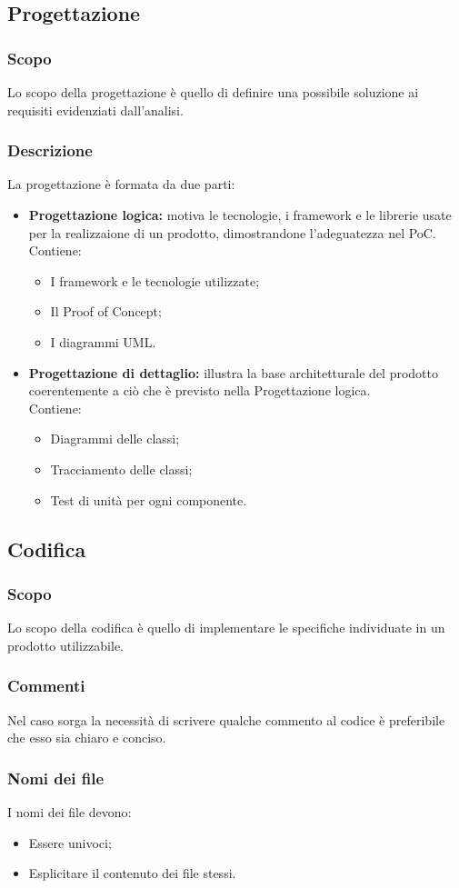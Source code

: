   \subsection{Progettazione}
  \subsubsection{Scopo}
  Lo scopo della progettazione è quello di definire una possibile soluzione ai requisiti evidenziati dall'analisi.
  \subsubsection{Descrizione}
  La progettazione è formata da due parti:
  \begin{itemize}
    \item \textbf{Progettazione logica:} motiva le tecnologie, i framework e le librerie usate per la realizzaione di un prodotto, dimostrandone l'adeguatezza nel PoC.
    \\Contiene:
    \begin{itemize}
      \item I framework e le tecnologie utilizzate;
      \item Il Proof of Concept;
      \item I diagrammi UML.
    \end{itemize}
    \item \textbf{Progettazione di dettaglio:} illustra la base architetturale del prodotto coerentemente a ciò che è previsto nella Progettazione logica.
    \\Contiene:
    \begin{itemize}
      \item Diagrammi delle classi;
      \item Tracciamento delle classi;
      \item Test di unità per ogni componente.
    \end{itemize}
  \end{itemize}

  \subsection{Codifica}
  \subsubsection{Scopo}
  Lo scopo della codifica è quello di implementare le specifiche individuate in un prodotto utilizzabile.
  \subsubsection{Commenti}
  Nel caso sorga la necessità di scrivere qualche commento al codice è preferibile che esso sia chiaro e conciso.
  \subsubsection{Nomi dei file}
  I nomi dei file devono:
  \begin{itemize}
    \item Essere univoci;
    \item Esplicitare il contenuto dei file stessi.
  \end{itemize}
